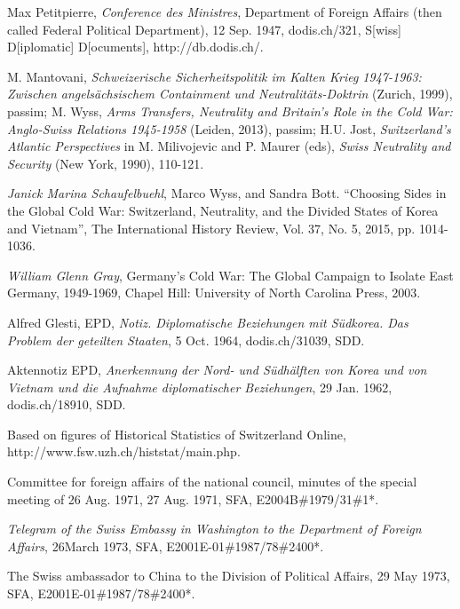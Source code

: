 \documentclass[a4paper]{article}
\begin{document}
\begin{thebibliography}{9}
\label{reference39}
Max Petitpierre, \emph{Conference des Ministres}, Department of Foreign Affairs (then called Federal Political Department), 12 Sep. 1947, dodis.ch/321, S[wiss] D[iplomatic] D[ocuments], http://db.dodis.ch/.

\label{reference40}
M. Mantovani, \emph{Schweizerische Sicherheitspolitik im Kalten Krieg 1947-1963: Zwischen angelsächsischem Containment und Neutralitäts-Doktrin} (Zurich, 1999), passim; M. Wyss, \emph{Arms Transfers, Neutrality and Britain’s Role in the Cold War: Anglo-Swiss Relations 1945-1958} (Leiden, 2013), passim; H.U. Jost, \emph{Switzerland’s Atlantic Perspectives} in M. Milivojevic and P. Maurer (eds), \emph{Swiss Neutrality and Security} (New York, 1990), 110-121.

\label{reference41}
\emph{Janick Marina Schaufelbuehl}, Marco Wyss, and Sandra Bott. “Choosing Sides in the Global Cold War: Switzerland, Neutrality, and the Divided States of Korea and Vietnam”, The International History Review, Vol. 37, No. 5, 2015, pp. 1014-1036.

\label{reference42}
\emph{William Glenn Gray}, Germany’s Cold War: The Global Campaign to Isolate East Germany, 1949-1969, Chapel Hill: University of North Carolina Press, 2003.

\label{reference43}
Alfred Glesti, EPD, \emph{Notiz. Diplomatische Beziehungen mit Südkorea. Das Problem der geteilten Staaten}, 5 Oct. 1964, dodis.ch/31039, SDD.

\label{reference44}
Aktennotiz EPD, \emph{Anerkennung der Nord- und Südhälften von Korea und von Vietnam und die Aufnahme diplomatischer Beziehungen}, 29 Jan. 1962, dodis.ch/18910, SDD.

\label{reference45}
Based on figures of Historical Statistics of Switzerland Online, http://www.fsw.uzh.ch/histstat/main.php.

\label{reference46}
Committee for foreign affairs of the national council, minutes of the special meeting of 26 Aug. 1971, 27 Aug. 1971, SFA, E2004B\#1979/31\#1*.

\label{reference47}
\emph{Telegram of the Swiss Embassy in Washington to the Department of Foreign Affairs}, 26March 1973, SFA, E2001E-01\#1987/78\#2400*.

\label{reference48}
The Swiss ambassador to China to the Division of Political Affairs, 29 May 1973, SFA, E2001E-01\#1987/78\#2400*.

\end{thebibliography}
\end{document}
